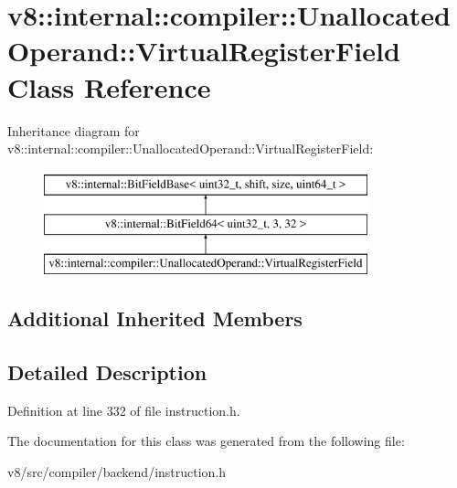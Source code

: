\hypertarget{classv8_1_1internal_1_1compiler_1_1UnallocatedOperand_1_1VirtualRegisterField}{}\section{v8\+:\+:internal\+:\+:compiler\+:\+:Unallocated\+Operand\+:\+:Virtual\+Register\+Field Class Reference}
\label{classv8_1_1internal_1_1compiler_1_1UnallocatedOperand_1_1VirtualRegisterField}
Inheritance diagram for v8\+:\+:internal\+:\+:compiler\+:\+:Unallocated\+Operand\+:\+:Virtual\+Register\+Field\+:\begin{figure}[H]
\begin{center}
\leavevmode
\includegraphics[height=3.000000cm]{classv8_1_1internal_1_1compiler_1_1UnallocatedOperand_1_1VirtualRegisterField}
\end{center}
\end{figure}
\subsection*{Additional Inherited Members}


\subsection{Detailed Description}


Definition at line 332 of file instruction.\+h.



The documentation for this class was generated from the following file\+:\begin{DoxyCompactItemize}
\item 
v8/src/compiler/backend/instruction.\+h\end{DoxyCompactItemize}
